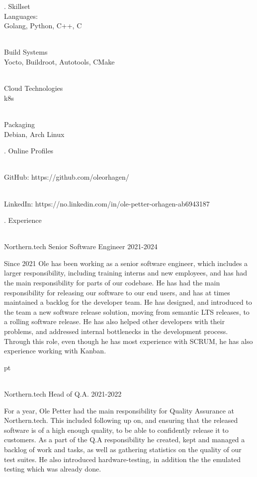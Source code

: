 \finishpage

. {Skillset}
\\ Languages:
\\ \star Golang, Python, C++, C

\\ Build Systems
\\ \star Yocto, Buildroot, Autotools, CMake

\\ Cloud Technologies
\\ \star k8s

\\ Packaging
\\ \star Debian, Arch Linux

. {Online Profiles}

\\ \star GitHub: https://github.com/oleorhagen/

\\ \star LinkedIn: https://no.linkedin.com/in/ole-petter-orhagen-ab6943187

. {Experience}

\\ \star Northern.tech Senior Software Engineer 2021-2024

Since 2021 Ole has been working as a senior software engineer, which includes a
larger responsibility, including training interns and new employees, and has had
the main responsibility for parts of our codebase. He has had the main
responsibility for releasing our software to our end users, and has at times
maintained a backlog for the developer team. He has designed, and introduced to
the team a new software release solution, moving from semantic LTS releases, to
a rolling software release. He has also helped other developers with their
problems, and addressed internal bottlenecks in the development process. Through
this role, even though he has most experience with SCRUM, he has also experience
working with Kanban.

 pt

\\ \star Northern.tech Head of Q.A. 2021-2022

For a year, Ole Petter had the main responsibility for Quality Assurance at
Northern.tech. This included following up on, and ensuring that the released
software is of a high enough quality, to be able to confidently release it to
customers. As a part of the Q.A responsibility he created, kept and managed a
backlog of work and tasks, as well as gathering statistics on the quality of our
test suites. He also introduced hardware-testing, in addition the the emulated
testing which was already done.

